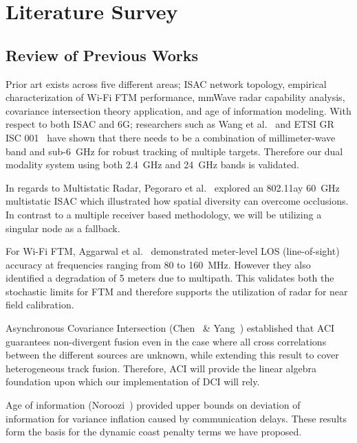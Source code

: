 \chapter{Literature Survey}
\label{chap:litsurvey}

\section{Review of Previous Works}
\label{sec:priorwork}

Prior art exists across five different areas; ISAC network topology, empirical characterization of Wi-Fi FTM performance, mmWave radar capability analysis, covariance intersection theory application, and age of information modeling. With respect to both ISAC and 6G; researchers such as Wang et al.~\cite{wang_isac} and ETSI GR ISC 001~\cite{etsi_isc_001} have shown that there needs to be a combination of millimeter-wave band and sub-6~GHz for robust tracking of multiple targets. Therefore our dual modality system using both 2.4~GHz and 24~GHz bands is validated.

In regards to Multistatic Radar, Pegoraro et al.~\cite{pegoraro_asymov} explored an 802.11ay 60~GHz multistatic ISAC which illustrated how spatial diversity can overcome occlusions. In contrast to a multiple receiver based methodology, we will be utilizing a singular node as a fallback.

For Wi-Fi FTM, Aggarwal et al.~\cite{aggarwal_wifi} demonstrated meter-level LOS (line-of-sight) accuracy at frequencies ranging from 80 to 160~MHz. However they also identified a degradation of 5 meters due to multipath. This validates both the stochastic limits for FTM and therefore supports the utilization of radar for near field calibration.

Asynchronous Covariance Intersection (Chen~\cite{chen_ci} \& Yang~\cite{yang_heterogeneous}) established that ACI guarantees non-divergent fusion even in the case where all cross correlations between the different sources are unknown, while extending this result to cover heterogeneous track fusion. Therefore, ACI will provide the linear algebra foundation upon which our implementation of DCI will rely.

Age of information (Noroozi~\cite{noroozi_aoi}) provided upper bounds on deviation of information for variance inflation caused by communication delays. These results form the basis for the dynamic coast penalty terms we have proposed.

